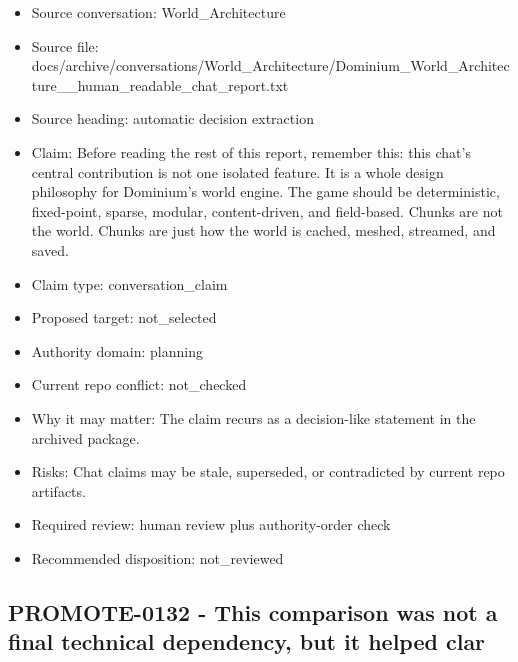 \documentclass[11pt,a4paper]{report}
\begin{document}
\begin{itemize}
\item Source conversation: World\_Architecture
\item Source file: docs/archive/conversations/World\_Architecture/Dominium\_World\_Architecture\_\_human\_readable\_chat\_report.txt
\item Source heading: automatic decision extraction
\item Claim: Before reading the rest of this report, remember this: this chat's central contribution is not one isolated feature. It is a whole design philosophy for Dominium's world engine. The game should be deterministic, fixed-point, sparse, modular, content-driven, and field-based. Chunks are not the world. Chunks are just how the world is cached, meshed, streamed, and saved.
\item Claim type: conversation\_claim
\item Proposed target: not\_selected
\item Authority domain: planning
\item Current repo conflict: not\_checked
\item Why it may matter: The claim recurs as a decision-like statement in the archived package.
\item Risks: Chat claims may be stale, superseded, or contradicted by current repo artifacts.
\item Required review: human review plus authority-order check
\item Recommended disposition: not\_reviewed
\end{itemize}

\subsection{PROMOTE-0132 - This comparison was not a final technical dependency, but it helped clar}
\end{document}
